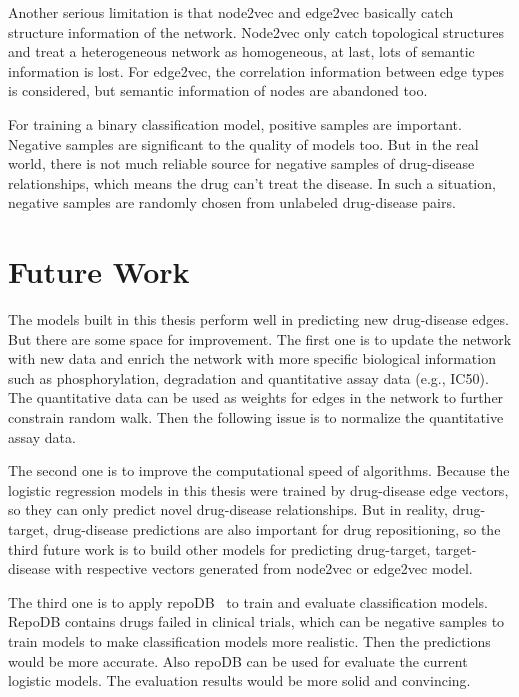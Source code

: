 Another serious limitation is that node2vec and edge2vec basically catch structure information of the network. Node2vec only catch topological structures and treat a heterogeneous network as homogeneous, at last, lots of semantic information is lost. For edge2vec, the correlation information between edge types is considered, but semantic information of nodes are abandoned too.

For training a binary classification model, positive samples are important. Negative samples are significant to the quality of models too. But in the real world, there is not much reliable source for negative samples of drug-disease relationships, which means the drug can’t treat the disease. In such a situation, negative samples are randomly chosen from unlabeled drug-disease pairs.


\section{Future Work}

The models built in this thesis perform well in predicting new drug-disease edges. But there are some space for improvement. The first one is to update the network with new data and enrich the network with more specific biological information such as phosphorylation, degradation and quantitative assay data (e.g., IC50). The quantitative data can be used as weights for edges in the network to further constrain random walk. Then the following issue is to normalize the quantitative assay data.

The second one is to improve the computational speed of algorithms. Because the logistic regression models in this thesis were trained by drug-disease edge vectors, so they can only predict novel drug-disease relationships. But in reality, drug-target, drug-disease predictions are also important for drug repositioning, so the third future work is to build other models for predicting drug-target, target-disease with respective vectors generated from node2vec or edge2vec model.

The third one is to apply repoDB~\cite{shameer_systematic_2018} to train and evaluate classification models. RepoDB contains drugs failed in clinical trials, which can be negative samples to train models to make classification models more realistic. Then the predictions would be more accurate. Also repoDB can be used for evaluate the current logistic models. The evaluation results would be more solid and convincing.

